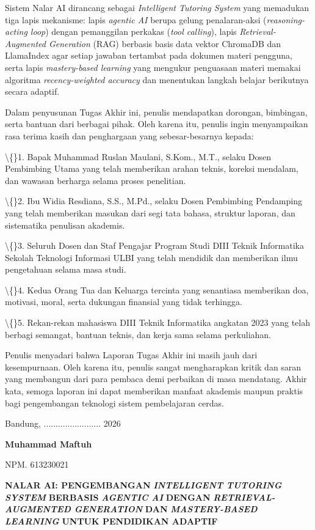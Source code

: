 \documentclass[12pt,a4paper]{article}
\begin{document}
Sistem Nalar AI dirancang sebagai \textit{Intelligent Tutoring System} yang memadukan tiga lapis mekanisme: lapis \textit{agentic AI} berupa gelung penalaran-aksi (\textit{reasoning-acting loop}) dengan pemanggilan perkakas (\textit{tool calling}), lapis \textit{Retrieval-Augmented Generation} (RAG) berbasis basis data vektor ChromaDB dan LlamaIndex agar setiap jawaban tertambat pada dokumen materi pengguna, serta lapis \textit{mastery-based learning} yang mengukur penguasaan materi memakai algoritma \textit{recency-weighted accuracy} dan menentukan langkah belajar berikutnya secara adaptif.

Dalam penyusunan Tugas Akhir ini, penulis mendapatkan dorongan, bimbingan, serta bantuan dari berbagai pihak. Oleh karena itu, penulis ingin menyampaikan rasa terima kasih dan penghargaan yang sebesar-besarnya kepada:

\textbackslash\{\}1.	Bapak Muhammad Ruslan Maulani, S.Kom., M.T., selaku Dosen Pembimbing Utama yang telah memberikan arahan teknis, koreksi mendalam, dan wawasan berharga selama proses penelitian.

\textbackslash\{\}2.	Ibu Widia Resdiana, S.S., M.Pd., selaku Dosen Pembimbing Pendamping yang telah memberikan masukan dari segi tata bahasa, struktur laporan, dan sistematika penulisan akademis.

\textbackslash\{\}3.	Seluruh Dosen dan Staf Pengajar Program Studi DIII Teknik Informatika Sekolah Teknologi Informasi ULBI yang telah mendidik dan memberikan ilmu pengetahuan selama masa studi.

\textbackslash\{\}4.	Kedua Orang Tua dan Keluarga tercinta yang senantiasa memberikan doa, motivasi, moral, serta dukungan finansial yang tidak terhingga.

\textbackslash\{\}5.	Rekan-rekan mahasiswa DIII Teknik Informatika angkatan 2023 yang telah berbagi semangat, bantuan teknis, dan kerja sama selama perkuliahan.

Penulis menyadari bahwa Laporan Tugas Akhir ini masih jauh dari kesempurnaan. Oleh karena itu, penulis sangat mengharapkan kritik dan saran yang membangun dari para pembaca demi perbaikan di masa mendatang. Akhir kata, semoga laporan ini dapat memberikan manfaat akademis maupun praktis bagi pengembangan teknologi sistem pembelajaran cerdas.

Bandung, ........................ 2026

\textbf{Muhammad Maftuh}

NPM. 613230021

\newpage
\textbf{NALAR AI: PENGEMBANGAN} \textbf{\textit{INTELLIGENT TUTORING SYSTEM}} \textbf{BERBASIS} \textbf{\textit{AGENTIC AI}} \textbf{DENGAN} \textbf{\textit{RETRIEVAL-AUGMENTED GENERATION}} \textbf{DAN} \textbf{\textit{MASTERY-BASED LEARNING}} \textbf{UNTUK PENDIDIKAN ADAPTIF}
\end{document}
